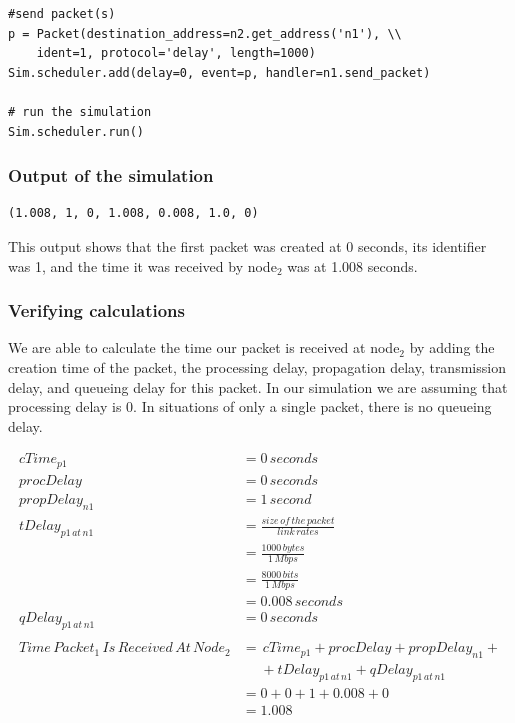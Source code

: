 \documentclass[fleqn,11pt]{article}
\begin{document}
\begin{lstlisting}
#send packet(s)
p = Packet(destination_address=n2.get_address('n1'), \\
	ident=1, protocol='delay', length=1000)
Sim.scheduler.add(delay=0, event=p, handler=n1.send_packet)

# run the simulation
Sim.scheduler.run()
\end{lstlisting}

\subsubsection{Output of the simulation}
\begin{lstlisting}
(1.008, 1, 0, 1.008, 0.008, 1.0, 0)
\end{lstlisting}
This output shows that the first packet was created at 0 seconds, its identifier was 1, and the time it was received by node$_2$ was at 1.008 seconds.

\subsubsection{Verifying calculations}

We are able to calculate the time our packet is received at node$_2$ by adding the creation time of the packet, the processing delay, propagation delay, transmission delay, and queueing delay for this packet. In our simulation we are assuming that processing delay is 0. In situations of only a single packet, there is no queueing delay.

\begin{align*}
cTime_{p1} &= 0\,seconds\\
procDelay &= 0\,seconds\\
propDelay_{n1} &= 1\,second\\
tDelay_{p1\,at\,n1} &=  \frac{size\,of\,the\,packet} {link\,rates}\\
&= \frac{1000\,bytes} {1\,Mbps}\\
&=  \frac{8000\,bits} {1\,Mbps}\\
&= 0.008\,seconds\\
qDelay_{p1\,at\,n1} &= 0\,seconds\\
\\
Time\,Packet_{1}\,Is\,Received\,At\,Node_{2} &= \,cTime_{p1} + procDelay + propDelay_{n1} +\\
&\,\,\,\,\,\,\,\, + tDelay_{p1\,at\,n1} + qDelay_{p1\,at\,n1} \\
&= 0 + 0 + 1 + 0.008 + 0 \\
&= 1.008
\end{align*}
\end{document}
